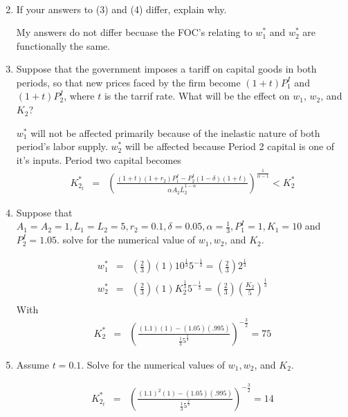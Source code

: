 \documentclass[11pt]{SelfArxOneColBMN}
\begin{document}
\begin{enumerate}
\begin{solution}
\begin{eqnarray*}
    \end{eqnarray*}
  \end{solution}
  \item If your answers to (3) and (4) differ, explain why.
  \begin{solution}
    My answers do not differ becuase the FOC's relating to $w_1^*$ and $w_2^*$ are functionally the same.
  \end{solution}
  \item Suppose that the government imposes a tariff on capital goods in both periods, so that new prices faced by the firm become $(1 + t)P_1^I$ and $(1 + t)P_2^I$, where $t$ is the tarrif rate. What will be the effect on $w_1$, $w_2$, and $K_2$?
  \begin{solution}
    $w_1^*$ will not be affected primarily because of the inelastic nature of both period's labor supply. $w_2^*$ will be affected because Period 2 capital is one of it's inputs. Period two capital becomes
    \begin{eqnarray*}
      K_{2_t}^* &=& (\frac{(1 + t)(1 + r_2)P_1^I - P_2^I(1 - \delta)(1 + t)}{\alpha A_2\bar{L}_2^{1 - \alpha}})^\frac{1}{\alpha - 1} < K_2^*
    \end{eqnarray*}
  \end{solution}
  \item Suppose that $A_1 = A_2 = 1, L_1 = L_2 = 5, r_2 = 0.1, \delta = 0.05, \alpha = \frac{1}{3}, P_1^I = 1, K_1 = 10$ and $P_2^I = 1.05$. solve for the numerical value of $w_1, w_2$, and $K_2$.
  \begin{solution}
    \begin{eqnarray*}
      w_1^* &=& (\frac{2}{3})(1)10^{\frac{1}{3}}5^{-\frac{1}{3}} = (\frac{2}{3})2^{\frac{1}{3}}\\
      w_2^* &=& (\frac{2}{3})(1)K_2^{\frac{1}{3}}5^{-\frac{1}{3}} = (\frac{2}{3})(\frac{K_2}{5})^\frac{1}{3}\\
    \end{eqnarray*}
    With
    \begin{eqnarray*}
      K_2^* &=& (\frac{(1.1)(1) - (1.05)(.995)}{\frac{1}{3} 5^{\frac{2}{3}}})^{-\frac{3}{2}} = 75
    \end{eqnarray*}
  \end{solution}
  \item Assume $t = 0.1$. Solve for the numerical values of $w_1, w_2$, and $K_2$.
  \begin{solution}
   \begin{eqnarray*}
      K_{2_t}^* &=& (\frac{(1.1)^2(1) - (1.05)(.995)}{\frac{1}{3} 5^{\frac{2}{3}}})^{-\frac{3}{2}} = 14
   \end{eqnarray*} 
  \end{solution}
\end{enumerate}
\end{document}
